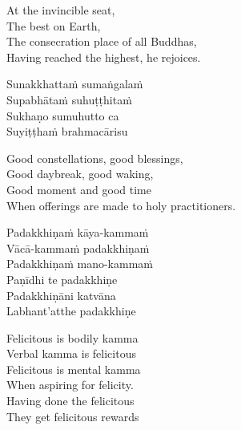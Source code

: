 \begin{english-verses}
  At the invincible seat,\\
  The best on Earth,\\
  The consecration place of all Buddhas,\\
  Having reached the highest, he rejoices.
\end{english-verses}

\ifbfive\vspace{-0.5em}\fi
\suttaRef{[MJG]}

\begin{pali-hang-continued}
  Sunakkhattaṁ sumaṅgalaṁ\\
  Supabhātaṁ suhuṭṭhitaṁ\\
  Sukhaṇo sumuhutto ca\\
  Suyiṭṭhaṁ brahmacārisu
\end{pali-hang-continued}

\begin{english-verses}
  Good constellations, good blessings,\\
  Good daybreak, good waking,\\
  Good moment and good time\\
  When offerings are made to holy practitioners.
\end{english-verses}

\ifninebythirteen\clearpage\fi

\begin{pali-hang-continued}
  Padakkhiṇaṁ kāya-kammaṁ\\
  Vācā-kammaṁ padakkhiṇaṁ\\
  Padakkhiṇaṁ mano-kammaṁ\\
  Paṇīdhi te padakkhiṇe\ifdigital\makeatletter\hyperlink{endnote130-appendix}\makeatother\fi\\
  Padakkhiṇāni katvāna\\
  Labhant'atthe padakkhiṇe
\end{pali-hang-continued}

\begin{english-verses}
  Felicitous is bodily kamma\\
  Verbal kamma is felicitous\\
  Felicitous is mental kamma\\
  When aspiring for felicity.\\
  Having done the felicitous\\
  They get felicitous rewards
\end{english-verses}


